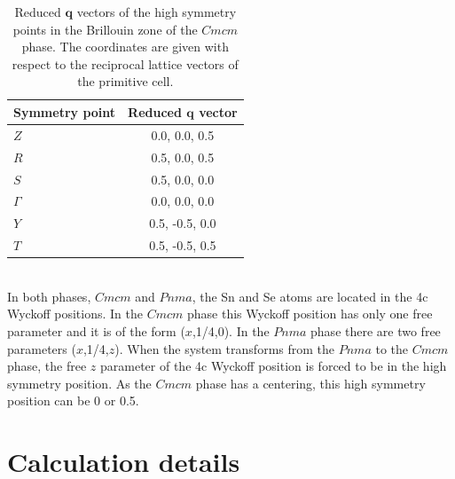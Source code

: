 \begin{table}
\begin{center}
\begin{tabular*}{0.45\textwidth}{l c}
 \hline
 \hline
             Symmetry point  & Reduced $\mathbf{q}$ vector  \\
 \hline
 $Z$                  &  0.0, 0.0, 0.5  \\
 $R$                  &  0.5, 0.0, 0.5  \\
 $S$                  &  0.5, 0.0, 0.0  \\
 $\Gamma$             &  0.0, 0.0, 0.0  \\
 $Y$                  &  0.5, -0.5, 0.0  \\
 $T$                  &  0.5, -0.5, 0.5  \\
 \hline
 \hline
\end{tabular*}
\end{center}
\caption[Reduced $\mathbf{q}$ vectors of the high symmetry points in the Brillouin zone of the $Cmcm$ phase.]{Reduced 
$\mathbf{q}$ vectors of the high symmetry points in the Brillouin zone of the $Cmcm$ phase. The coordinates are given 
with respect to the reciprocal lattice vectors of the primitive cell.}
\label{qpoints}
\end{table}
\\

In both phases, $Cmcm$ and $Pnma$, the Sn and Se atoms are located in the 4c Wyckoff positions. In the $Cmcm$ phase 
this Wyckoff position has only one free parameter and it is of the form ($x$,1/4,0). In the $Pnma$ phase there are 
two free parameters ($x$,1/4,$z$). When the system transforms from the $Pnma$ to the $Cmcm$ phase, the free $z$ 
parameter of the 4c Wyckoff position is forced to be in the high symmetry position. As the $Cmcm$ phase has a 
centering, this high symmetry position can be 0 or 0.5.

\section{Calculation details}

